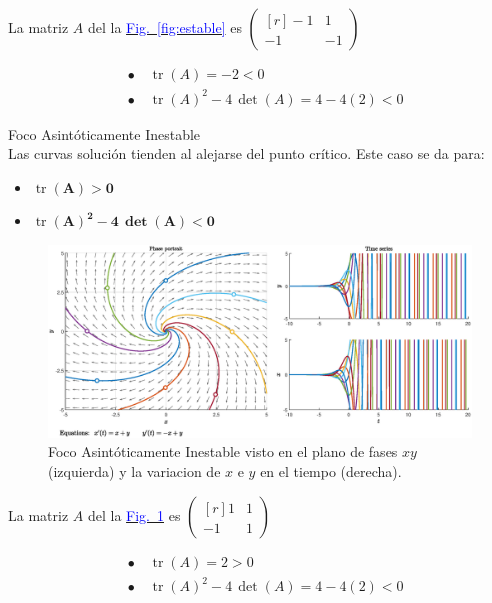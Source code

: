 \documentclass[12pt,a4paper]{report} %
\newcommand{\fref}[1]{\hyperref[#1]{\textcolor{blue}{Fig.~\ref*{#1}}}}
\newcommand{\fref}[1]{\hyperref[#1]{\textcolor{blue}{\textit{Fig.~\ref*{#1}}}}}
\newcommand{\tr}{\operatorname{\textrm{tr}}}
\begin{document}
	La matriz $A$ del la \fref{fig:estable} es 
	$\begin{pmatrix*}[r]
		-1 & 1 \\
		-1 & -1
	\end{pmatrix*}$
	
	\begin{align*}
		&\bullet\quad \tr(A)=-2<0 \\[2mm]
		&\bullet\quad \tr(A)^2-4\, \det(A)=4-4(2)<0
	\end{align*}
	
	\newpage
	
	{\Large\textbullet\quad Foco Asintóticamente Inestable}\\[0.5cm]
	
	Las curvas solución tienden al alejarse del punto crítico. Este caso se da para: 
	\begin{itemize}
		\item \textbf{$\tr$}$\bm{(A)>0}$
		\item \textbf{$\tr$}$\bm{(A)^2-4\, \det(A)<0}$
	\end{itemize}
	
	\begin{figure}[h]
		\centering
		\includegraphics[width=1\textwidth]{inestable.eps}
		\caption{Foco Asintóticamente Inestable visto en el plano de fases $xy$ (izquierda) y la variacion de $x$ e $y$ en el tiempo (derecha).}
		\label{fig:inestable}
	\end{figure}\smallskip
	
	La matriz $A$ del la \fref{fig:inestable} es 
	 $\begin{pmatrix*}[r]
		 1 & 1 \\
		-1 & 1
	 \end{pmatrix*}$
	
	\begin{align*}
		&\bullet\quad \tr(A)=2>0 \\[2mm]
		&\bullet\quad \tr(A)^2-4\, \det(A)=4-4(2)<0
	\end{align*}
	
\end{document}
